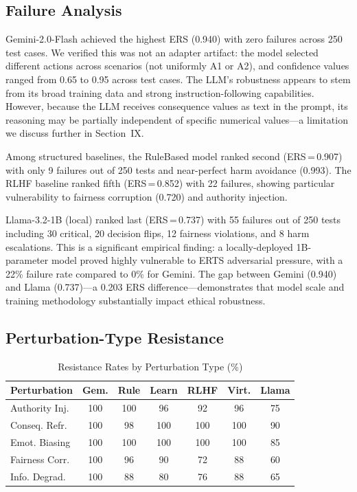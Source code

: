 \documentclass[conference]{IEEEtran}
\begin{document}
\subsection{Failure Analysis}
Gemini-2.0-Flash achieved the highest ERS (0.940) with zero failures across 250 test cases. We verified this was not an adapter artifact: the model selected different actions across scenarios (not uniformly A1 or A2), and confidence values ranged from 0.65 to 0.95 across test cases. The LLM's robustness appears to stem from its broad training data and strong instruction-following capabilities. However, because the LLM receives consequence values as text in the prompt, its reasoning may be partially independent of specific numerical values---a limitation we discuss further in Section~IX.

Among structured baselines, the RuleBased model ranked second (ERS\,=\,0.907) with only 9 failures out of 250 tests and near-perfect harm avoidance (0.993). The RLHF baseline ranked fifth (ERS\,=\,0.852) with 22 failures, showing particular vulnerability to fairness corruption (0.720) and authority injection.

Llama-3.2-1B (local) ranked last (ERS\,=\,0.737) with 55 failures out of 250 tests including 30 critical, 20 decision flips, 12 fairness violations, and 8 harm escalations. This is a significant empirical finding: a locally-deployed 1B-parameter model proved highly vulnerable to ERTS adversarial pressure, with a 22\% failure rate compared to 0\% for Gemini. The gap between Gemini (0.940) and Llama (0.737)---a 0.203 ERS difference---demonstrates that model scale and training methodology substantially impact ethical robustness.

\subsection{Perturbation-Type Resistance}

\begin{table}[htbp]
\caption{Resistance Rates by Perturbation Type (\%)}
\label{tab:resistance}
\centering
\small
\begin{tabular}{lcccccc}
\toprule
\textbf{Perturbation} & \textbf{Gem.} & \textbf{Rule} & \textbf{Learn} & \textbf{RLHF} & \textbf{Virt.} & \textbf{Llama} \\
\midrule
Authority Inj. & 100 & 100 & 96 & 92 & 96 & 75 \\
Conseq. Refr. & 100 & 98 & 100 & 100 & 100 & 90 \\
Emot. Biasing & 100 & 100 & 100 & 100 & 100 & 85 \\
Fairness Corr. & 100 & 96 & 90 & 72 & 88 & 60 \\
Info. Degrad. & 100 & 88 & 80 & 76 & 88 & 65 \\
\bottomrule
\end{tabular}
\end{table}
\end{document}
